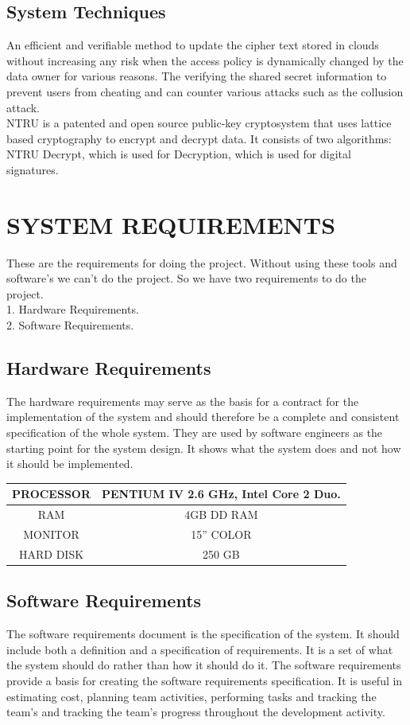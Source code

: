\documentclass[BTech]{srmuthesis}
\begin{document}
\section{System Techniques}
An efficient and verifiable method to update the cipher text stored in clouds without increasing any risk when the access policy is dynamically changed by the data owner for various reasons. The verifying the shared secret information to prevent users from cheating and can counter various attacks such as the collusion attack.\\
NTRU is a patented and open source public-key cryptosystem that uses lattice based cryptography to encrypt and decrypt data. It consists of two algorithms: NTRU Decrypt, which is used for Decryption, which is used for digital signatures.\\

\chapter{SYSTEM REQUIREMENTS}
These are the requirements for doing the project. Without using these tools and software’s we can’t do the project. So we have two requirements to do the project.\\
1. Hardware Requirements.\\
2. Software Requirements.\\
\section{Hardware Requirements}
The hardware requirements may serve as the basis for a contract for the implementation of the system and should therefore be a complete and consistent specification of the whole system. They are used by software engineers as the starting point for the system design. It shows what the system does and not how it should be implemented.\\

\begingroup
\centering
\begin{tabular}{|c|c|}
\hline
PROCESSOR & PENTIUM IV 2.6 GHz, Intel Core 2 Duo.\\
\hline
RAM & 4GB DD RAM\\
\hline
MONITOR & 15” COLOR\\
\hline
HARD DISK & 250 GB\\
\hline
\end{tabular}
\label{tbl:table1}
\endgroup 
\section{Software Requirements}
The software requirements document is the specification of the system. It should include both a definition and a specification of requirements. It is a set of what the system should do rather than how it should do it. The software requirements provide a basis for creating the software requirements specification. It is useful in estimating cost, planning team activities, performing tasks and tracking the team’s and tracking the team’s progress throughout the development activity.\\
\end{document}
